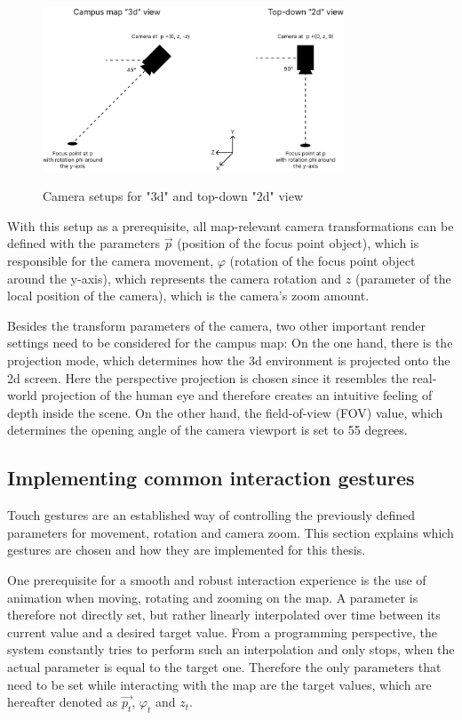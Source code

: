 \begin{figure}[H]
	\centering
	\includegraphics[width=0.8\textwidth]{images/camera_setup.png}\\
	\caption{Camera setups for "3d" and top-down "2d" view}
\end{figure}

With this setup as a prerequisite, all map-relevant camera transformations can be defined with the parameters $\overrightarrow{p}$ (position of the focus point object), which is responsible for the camera movement, $\varphi$ (rotation of the focus point object around the y-axis), which represents the camera rotation and $z$ (parameter of the local position of the camera), which is the camera's zoom amount.

Besides the transform parameters of the camera, two other important render settings need to be considered for the campus map: On the one hand, there is the projection mode, which determines how the 3d environment is projected onto the 2d screen. Here the perspective projection is chosen since it resembles the real-world projection of the human eye and therefore creates an intuitive feeling of depth inside the scene. On the other hand, the field-of-view (FOV) value, which determines the opening angle of the camera viewport is set to 55 degrees. 

\subsection{Implementing common interaction gestures}
Touch gestures are an established way of controlling the previously defined parameters for movement, rotation and camera zoom. This section explains which gestures are chosen and how they are implemented for this thesis.

One prerequisite for a smooth and robust interaction experience is the use of animation when moving, rotating and zooming on the map. A parameter is therefore not directly set, but rather linearly interpolated over time between its current value and a desired target value. From a programming perspective, the system constantly tries to perform such an interpolation and only stops, when the actual parameter is equal to the target one. Therefore the only parameters that need to be set while interacting with the map are the target values, which are hereafter denoted as $\overrightarrow{p_{t}}$, $\varphi_{t}$ and $z_{t}$.\\

